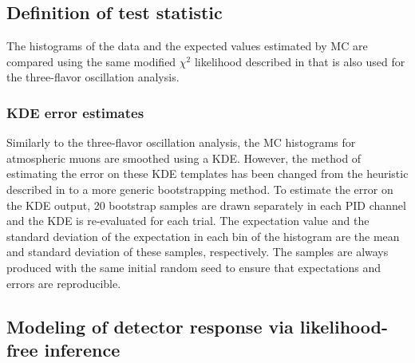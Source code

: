 \subsection{Definition of test statistic}
\label{sec:test-statistic-sterile}

The histograms of the data and the expected values estimated by MC are compared using the same modified $\chi^2$ likelihood described in  that is also used for the three-flavor oscillation analysis.

\subsubsection{KDE error estimates}
Similarly to the three-flavor oscillation analysis, the MC histograms for atmospheric muons are smoothed using a KDE.
However, the method of estimating the error on these KDE templates has been changed from the heuristic described in  to a more generic bootstrapping method.
To estimate the error on the KDE output, 20 bootstrap samples are drawn separately in each PID channel and the KDE is re-evaluated for each trial.
The expectation value and the standard deviation of the expectation in each bin of the histogram are the mean and standard deviation of these samples, respectively.
The samples are always produced with the same initial random seed to ensure that expectations and errors are reproducible.

\subsection{Modeling of detector response via likelihood-free inference}
\label{sec:ultrasurfaces}

